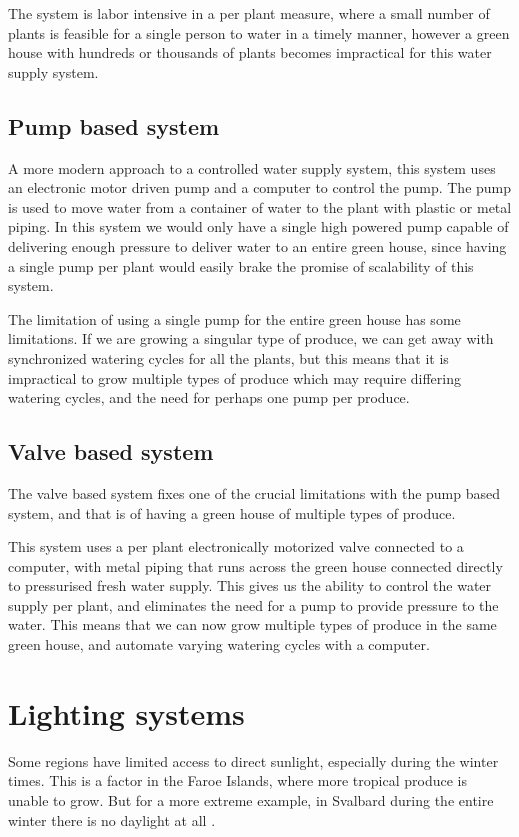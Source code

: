 \documentclass[a4paper,12pt,twoside,openright,titlepage]{book}
\begin{document}
The system is labor intensive in a per plant measure, where a small number of plants is feasible for a single person to water in a timely manner, however a green house with hundreds or thousands of plants becomes impractical for this water supply system.

\subsection{Pump based system}
A more modern approach to a controlled water supply system, this system uses an electronic motor driven pump and a computer to control the pump. The pump is used to move water from a container of water to the plant with plastic or metal piping. In this system we would only have a single high powered pump capable of delivering enough pressure to deliver water to an entire green house, since having a single pump per plant would easily brake the promise of scalability of this system.

The limitation of using a single pump for the entire green house has some limitations.
If we are growing a singular type of produce, we can get away with synchronized watering cycles for all the plants, but this means that it is impractical to grow multiple types of produce which may require differing watering cycles, and the need for perhaps one pump per produce.

\subsection{Valve based system}
The valve based system fixes one of the crucial limitations with the pump based system, and that is of having a green house of multiple types of produce.

This system uses a per plant electronically motorized valve connected to a computer, with metal piping that runs across the green house connected directly to pressurised fresh water supply.
This gives us the ability to control the water supply per plant, and eliminates the need for a pump to provide pressure to the water.
This means that we can now grow multiple types of produce in the same green house, and automate varying watering cycles with a computer.

\section{Lighting systems}
Some regions have limited access to direct sunlight, especially during the winter times.
This is a factor in the Faroe Islands, where more tropical produce is unable to grow.
But for a more extreme example, in Svalbard during the entire winter there is no daylight at all \cite{svalbard}.
\end{document}
